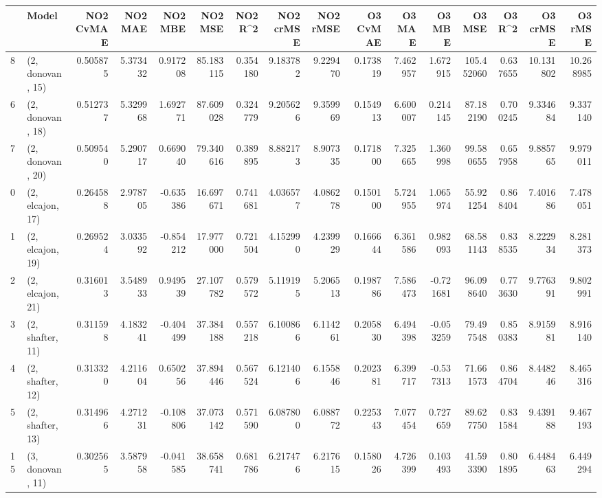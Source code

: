 \begin{tabular}{llrrrrrrrrrrrrrr}
\toprule
{} &             Model &  NO2 CvMAE &   NO2 MAE &   NO2 MBE &    NO2 MSE &   NO2 R\textasciicircum2 &  NO2 crMSE &  NO2 rMSE &  O3 CvMAE &    O3 MAE &    O3 MBE &      O3 MSE &    O3 R\textasciicircum2 &   O3 crMSE &    O3 rMSE \\
\midrule
8  &  (2, donovan, 15) &   0.505875 &  5.373432 &  0.917208 &  85.183115 &  0.354180 &   9.183782 &  9.229470 &  0.173819 &  7.462957 &  1.672915 &  105.452060 &  0.637655 &  10.131802 &  10.268985 \\
6  &  (2, donovan, 18) &   0.512737 &  5.329968 &  1.692771 &  87.609028 &  0.324779 &   9.205626 &  9.359969 &  0.154913 &  6.600007 &  0.214145 &   87.182190 &  0.700245 &   9.334684 &   9.337140 \\
7  &  (2, donovan, 20) &   0.509540 &  5.290717 &  0.669040 &  79.340616 &  0.389895 &   8.882173 &  8.907335 &  0.171800 &  7.325665 &  1.360998 &   99.580655 &  0.657958 &   9.885765 &   9.979011 \\
0  &  (2, elcajon, 17) &   0.264588 &  2.978705 & -0.635386 &  16.697671 &  0.741681 &   4.036577 &  4.086278 &  0.150100 &  5.724955 &  1.065974 &   55.921254 &  0.868404 &   7.401686 &   7.478051 \\
1  &  (2, elcajon, 19) &   0.269524 &  3.033592 & -0.854212 &  17.977000 &  0.721504 &   4.152990 &  4.239929 &  0.166644 &  6.361586 &  0.982093 &   68.581143 &  0.838535 &   8.222934 &   8.281373 \\
2  &  (2, elcajon, 21) &   0.316013 &  3.548933 &  0.949539 &  27.107782 &  0.579572 &   5.119195 &  5.206513 &  0.198786 &  7.586473 & -0.721681 &   96.098640 &  0.773630 &   9.776391 &   9.802991 \\
3  &  (2, shafter, 11) &   0.311598 &  4.183241 & -0.404499 &  37.384188 &  0.557218 &   6.100866 &  6.114261 &  0.205830 &  6.494398 & -0.053259 &   79.497548 &  0.850383 &   8.915981 &   8.916140 \\
4  &  (2, shafter, 12) &   0.313320 &  4.211604 &  0.650256 &  37.894446 &  0.567524 &   6.121406 &  6.155846 &  0.202381 &  6.399717 & -0.537313 &   71.661573 &  0.864704 &   8.448246 &   8.465316 \\
5  &  (2, shafter, 13) &   0.314966 &  4.271231 & -0.108806 &  37.073142 &  0.571590 &   6.087800 &  6.088772 &  0.225343 &  7.077454 &  0.727659 &   89.627750 &  0.831584 &   9.439188 &   9.467193 \\
15 &  (3, donovan, 11) &   0.302565 &  3.587958 & -0.041585 &  38.658741 &  0.681786 &   6.217476 &  6.217615 &  0.158026 &  4.726399 &  0.103493 &   41.593390 &  0.801895 &   6.448463 &   6.449294 \\

\end{tabular}
